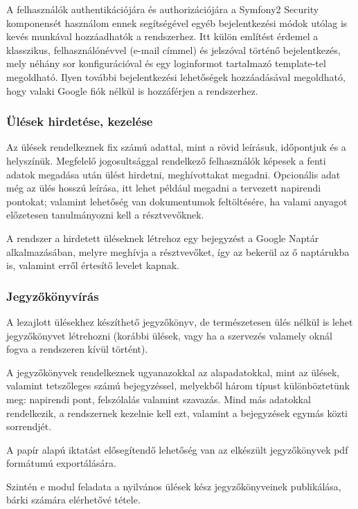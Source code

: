 \documentclass[a4paper,12pt,oneside]{report}
\begin{document}
A felhasználók authentikációjára és authorizációjára a Symfony2 Security komponensét használom \textendash{} ennek segítségével egyéb bejelentkezési módok utólag is kevés munkával hozzáadhatók a rendszerhez. Itt külön említést érdemel a klasszikus, felhasználónévvel (e-mail címmel) és jelszóval történő bejelentkezés, mely néhány sor konfigurációval és egy loginformot tartalmazó template-tel megoldható. Ilyen további bejelentkezési lehetőségek hozzáadásával megoldható, hogy valaki Google fiók nélkül is hozzáférjen a rendszerhez.

\subsubsection{Ülések hirdetése, kezelése}

Az ülések rendelkeznek fix számú adattal, mint a rövid leírásuk, időpontjuk és a helyszínük. Megfelelő jogosultsággal rendelkező felhasználók képesek a fenti adatok megadása után ülést hirdetni, meghívottakat megadni. Opcionális adat még az ülés hosszú leírása, itt lehet például megadni a tervezett napirendi pontokat; valamint lehetőség van dokumentumok feltöltésére, ha valami anyagot előzetesen tanulmányozni kell a résztvevőknek.

A rendszer a hirdetett üléseknek létrehoz egy bejegyzést a Google Naptár alkalmazásában, melyre meghívja a résztvevőket, így az bekerül az ő naptárukba is, valamint erről értesítő levelet kapnak.

\subsubsection{Jegyzőkönyvírás}

A lezajlott ülésekhez készíthető jegyzőkönyv, de természetesen ülés nélkül is lehet jegyzőkönyvet létrehozni (korábbi ülések, vagy ha a szervezés valamely oknál fogva a rendszeren kívül történt).

A jegyzőkönyvek rendelkeznek ugyanazokkal az alapadatokkal, mint az ülések, valamint tetszőleges számú bejegyzéssel, melyekből három típust különböztetünk meg: napirendi pont, felszólalás valamint szavazás. Mind más adatokkal rendelkezik, a rendszernek kezelnie kell ezt, valamint a bejegyzések egymás közti sorrendjét.

A papír alapú iktatást elősegítendő lehetőség van az elkészült jegyzőkönyvek pdf formátumú exportálására.

Szintén e modul feladata a nyilvános ülések kész jegyzőkönyveinek publikálása, bárki számára elérhetővé tétele.
\end{document}

